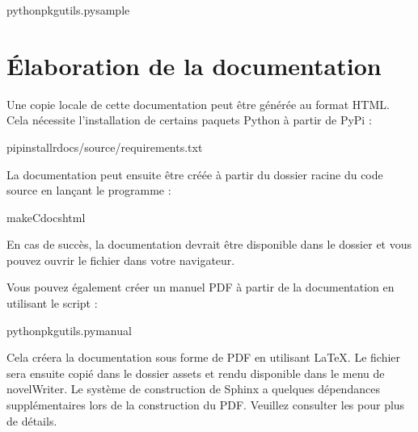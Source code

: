 \documentclass[a4paper,11pt,french]{sphinxmanual}
\begin{document}
\begin{sphinxVerbatim}[commandchars=\\\{\}]
pythonpkgutils.pysample
\end{sphinxVerbatim}


\section{Élaboration de la documentation}
\label{\detokenize{tech_source:building-the-documentation}}\label{\detokenize{tech_source:a-source-docs}}
\sphinxAtStartPar
Une copie locale de cette documentation peut être générée au format HTML. Cela nécessite l’installation de certains paquets Python à partir de PyPi :

\begin{sphinxVerbatim}[commandchars=\\\{\}]
pipinstall\PYGZhy{}rdocs/source/requirements.txt
\end{sphinxVerbatim}

\sphinxAtStartPar
La documentation peut ensuite être créée à partir du dossier racine du code source en lançant le programme :

\begin{sphinxVerbatim}[commandchars=\\\{\}]
make\PYGZhy{}Cdocshtml
\end{sphinxVerbatim}

\sphinxAtStartPar
En cas de succès, la documentation devrait être disponible dans le dossier  et vous pouvez ouvrir le fichier  dans votre navigateur.

\sphinxAtStartPar
Vous pouvez également créer un manuel PDF à partir de la documentation en utilisant le script  :

\begin{sphinxVerbatim}[commandchars=\\\{\}]
pythonpkgutils.pymanual
\end{sphinxVerbatim}

\sphinxAtStartPar
Cela créera la documentation sous forme de PDF en utilisant LaTeX. Le fichier sera ensuite copié dans le dossier assets et rendu disponible dans le menu  de novelWriter. Le système de construction de Sphinx a quelques dépendances supplémentaires lors de la construction du PDF. Veuillez consulter les  pour plus de détails.
\end{document}
